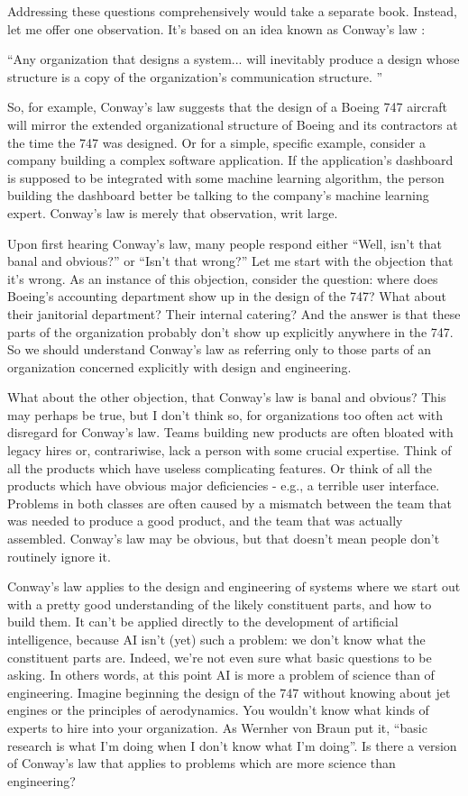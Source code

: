 Addressing these questions comprehensively would take a separate book. Instead, let me offer one observation. It's based on an idea known as Conway's law \cite{wikipediaConwayslaw2019}: 

``Any organization that designs a system... will inevitably produce a design whose structure is a copy of the organization's communication structure. ''

So, for example, Conway's law suggests that the design of a Boeing 747 aircraft will mirror the extended organizational structure of Boeing and its contractors at the time the 747 was designed. Or for a simple, specific example, consider a company building a complex software application. If the application's dashboard is supposed to be integrated with some machine learning algorithm, the person building the dashboard better be talking to the company's machine learning expert. Conway's law is merely that observation, writ large.

Upon first hearing Conway's law, many people respond either ``Well, isn't that banal and obvious?'' or ``Isn't that wrong?'' Let me start with the objection that it's wrong. As an instance of this objection, consider the question: where does Boeing's accounting department show up in the design of the 747? What about their janitorial department? Their internal catering? And the answer is that these parts of the organization probably don't show up explicitly anywhere in the 747. So we should understand Conway's law as referring only to those parts of an organization concerned explicitly with design and engineering.

What about the other objection, that Conway's law is banal and obvious? This may perhaps be true, but I don't think so, for organizations too often act with disregard for Conway's law. Teams building new products are often bloated with legacy hires or, contrariwise, lack a person with some crucial expertise. Think of all the products which have useless complicating features. Or think of all the products which have obvious major deficiencies - e.g., a terrible user interface. Problems in both classes are often caused by a mismatch between the team that was needed to produce a good product, and the team that was actually assembled. Conway's law may be obvious, but that doesn't mean people don't routinely ignore it.

Conway's law applies to the design and engineering of systems where we start out with a pretty good understanding of the likely constituent parts, and how to build them. It can't be applied directly to the development of artificial intelligence, because AI isn't (yet) such a problem: we don't know what the constituent parts are. Indeed, we're not even sure what basic questions to be asking. In others words, at this point AI is more a problem of science than of engineering. Imagine beginning the design of the 747 without knowing about jet engines or the principles of aerodynamics. You wouldn't know what kinds of experts to hire into your organization. As Wernher von Braun put it, ``basic research is what I'm doing when I don't know what I'm doing''. Is there a version of Conway's law that applies to problems which are more science than engineering?

